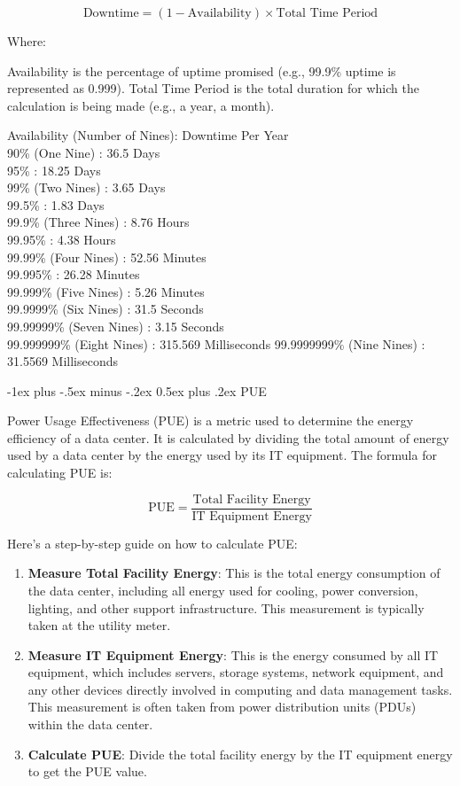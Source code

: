 \documentclass[10pt, landscape]{article}
\makeatletter
\renewcommand{\section}{\@startsection{section}{1}{0mm}%
  {-1ex plus -.5ex minus -.2ex}%
  {0.5ex plus .2ex}%
{\normalfont\large\bfseries}}
\makeatother
\begin{document}
\begin{multicols*}{4}
\[
\text{Downtime} = \left(1 - \text{Availability}\right) \times \text{Total Time Period}
\]

Where:

Availability is the percentage of uptime promised (e.g., 99.9\% uptime
is represented as 0.999). Total Time Period is the total duration for
which the calculation is being made (e.g., a year, a month).

Availability (Number of Nines): Downtime Per Year\\
90\% (One Nine) : 36.5 Days\\
95\% : 18.25 Days\\
99\% (Two Nines) : 3.65 Days\\
99.5\% : 1.83 Days\\
99.9\% (Three Nines) : 8.76 Hours\\
99.95\% : 4.38 Hours\\
99.99\% (Four Nines) : 52.56 Minutes\\
99.995\% : 26.28 Minutes\\
99.999\% (Five Nines) : 5.26 Minutes\\
99.9999\% (Six Nines) : 31.5 Seconds\\
99.99999\% (Seven Nines) : 3.15 Seconds\\
99.999999\% (Eight Nines) : 315.569 Milliseconds 99.9999999\% (Nine
Nines) : 31.5569 Milliseconds

\section{PUE}\label{pue}

Power Usage Effectiveness (PUE) is a metric used to determine the energy
efficiency of a data center. It is calculated by dividing the total
amount of energy used by a data center by the energy used by its IT
equipment. The formula for calculating PUE is:

\[
\text{PUE} = \frac{\text{Total Facility Energy}}{\text{IT Equipment Energy}}
\]

Here's a step-by-step guide on how to calculate PUE:

\begin{enumerate}
\def\labelenumi{\arabic{enumi}.}
\item
  \textbf{Measure Total Facility Energy}: This is the total energy
  consumption of the data center, including all energy used for cooling,
  power conversion, lighting, and other support infrastructure. This
  measurement is typically taken at the utility meter.
\item
  \textbf{Measure IT Equipment Energy}: This is the energy consumed by
  all IT equipment, which includes servers, storage systems, network
  equipment, and any other devices directly involved in computing and
  data management tasks. This measurement is often taken from power
  distribution units (PDUs) within the data center.
\item
  \textbf{Calculate PUE}: Divide the total facility energy by the IT
  equipment energy to get the PUE value.
\end{enumerate}


\end{multicols*}
\end{document}
